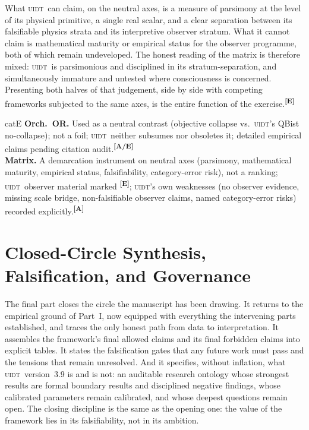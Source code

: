 \documentclass[12pt,a4paper,twoside]{article}
\theoremstyle{plain}
\theoremstyle{definition}
\theoremstyle{remark}
\newcommand{\UIDT}{\textsc{uidt}}
\newcommand{\catmark}[1]{\textsuperscript{\textsf{\textbf{[#1]}}}}
\begin{document}
What \UIDT\ can claim, on the neutral axes, is a measure of parsimony at the level of its physical primitive, a single real scalar, and a clear separation between its falsifiable physics strata and its interpretive observer stratum. What it cannot claim is mathematical maturity or empirical status for the observer programme, both of which remain undeveloped. The honest reading of the matrix is therefore mixed: \UIDT\ is parsimonious and disciplined in its stratum-separation, and simultaneously immature and untested where consciousness is concerned. Presenting both halves of that judgement, side by side with competing frameworks subjected to the same axes, is the entire function of the exercise.\catmark{E}

\begin{evidencebox}{catE}
\textbf{Orch.\ OR.} Used as a neutral contrast (objective collapse vs.\ \UIDT's QBist no-collapse); not a foil; \UIDT\ neither subsumes nor obsoletes it; detailed
empirical claims pending citation audit.\catmark{A/E}\\[0.3em]
\textbf{Matrix.} A demarcation instrument on neutral axes (parsimony, mathematical maturity, empirical status, falsifiability, category-error risk), not a ranking; \UIDT\ observer material marked \catmark{E}; \UIDT's own weaknesses (no observer evidence, missing scale bridge, non-falsifiable observer claims, named category-error risks) recorded explicitly.\catmark{A}
\end{evidencebox}

\part{Closed-Circle Synthesis, Falsification, and Governance}
\label{part:synthesis-governance}

\noindent The final part closes the circle the manuscript has been drawing. It returns to the empirical ground of Part~I, now equipped with everything the intervening parts established, and traces the only honest path from data to interpretation. It assembles the framework's final allowed claims and its final forbidden claims into explicit tables. It states the falsification gates that any future work must pass and the tensions that remain unresolved. And it specifies, without inflation, what \UIDT\ version~3.9 is and is not: an auditable research ontology whose strongest results are formal boundary results and disciplined negative findings, whose calibrated parameters remain calibrated, and whose deepest questions remain open. The closing discipline is the same as the opening one: the value of the framework lies in its falsifiability, not in its ambition.
\end{document}
